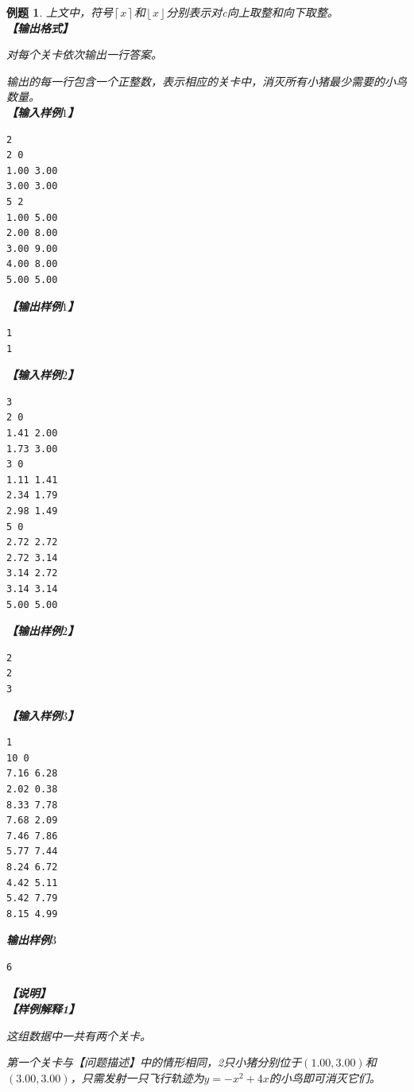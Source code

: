 \documentclass{article}
\newtheorem{example}{例题}[subsection]
\theoremstyle{nonumberplain}
\begin{document}
\begin{example}
上文中，符号$\left \lceil x \right \rceil$和$\left \lfloor x \right \rfloor$分别表示对c向上取整和向下取整。\\
\textbf{【输出格式】}

对每个关卡依次输出一行答案。

输出的每一行包含一个正整数，表示相应的关卡中，消灭所有小猪最少需要的小鸟数量。\\
\textbf{【输入样例$1$】}
\begin{verbatim}
2
2 0
1.00 3.00
3.00 3.00
5 2
1.00 5.00
2.00 8.00
3.00 9.00
4.00 8.00
5.00 5.00
\end{verbatim}
\textbf{【输出样例$1$】}
\begin{verbatim}
1
1
\end{verbatim}
\textbf{【输入样例$2$】}
\begin{verbatim}
3
2 0
1.41 2.00
1.73 3.00
3 0
1.11 1.41
2.34 1.79
2.98 1.49
5 0
2.72 2.72
2.72 3.14
3.14 2.72
3.14 3.14
5.00 5.00
\end{verbatim}
\textbf{【输出样例$2$】}
\begin{verbatim}
2
2
3
\end{verbatim}
\textbf{【输入样例$3$】}
\begin{verbatim}
1
10 0
7.16 6.28
2.02 0.38
8.33 7.78
7.68 2.09
7.46 7.86
5.77 7.44
8.24 6.72
4.42 5.11
5.42 7.79
8.15 4.99
\end{verbatim}
\textbf{输出样例$3$}
\begin{verbatim}
6
\end{verbatim}
\textbf{【说明】}\\
\textbf{【样例解释1】}

这组数据中一共有两个关卡。

第一个关卡与【问题描述】中的情形相同，2只小猪分别位于$(1.00,3.00)$和$(3.00,3.00)$，只需发射一只飞行轨迹为$y = -x^2 + 4x$的小鸟即可消灭它们。


\end{example}
\end{document}
